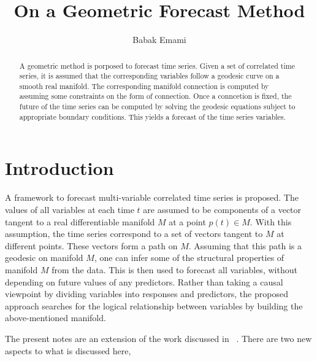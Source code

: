 \documentclass{article}
\begin{document}
\title{On a Geometric Forecast Method}

\author[1]{Babak Emami%
}
\address[1]{1335 Filbert St., 303, San Francisco, CA, United States 94109}

\begin{abstract}

A geometric method is porposed to forecast time series. Given a set of
correlated time series, it is assumed that the corresponding variables
follow a geodesic curve on a smooth real manifold. The corresponding
manifold connection is computed by assuming some constraints on the
form of connection. Once a conncetion is fixed, the future of the time
series can be computed by solving the geodesic equations subject to
appropriate boundary conditions. This yields a forecast of the time
series variables.

\end{abstract}

\maketitle

\section{Introduction}\label{section:introduction}

A framework to forecast multi-variable correlated time
series is proposed. The values of all variables at each time $t$
are assumed to be components of a vector tangent to a real
differentiable manifold $M$ at a point $p(t) \in M$. With this
assumption, the time series correspond to a set of vectors tangent to
$M$ at different points. These vectors form a path on $M$. Assuming
that this path is a geodesic on manifold $M$, one can infer some of
the structural properties of manifold $M$ from the data. This is then used to
forecast all variables, without depending on future values of any
predictors. Rather than taking a causal viewpoint by dividing
variables into responses and predictors, the proposed approach
searches for the logical relationship between variables by building
the above-mentioned manifold.

The present notes are an extension of the work discussed in
~\cite{emami-geo-2021}. There are two new aspects to what is discussed
here,
\end{document}
